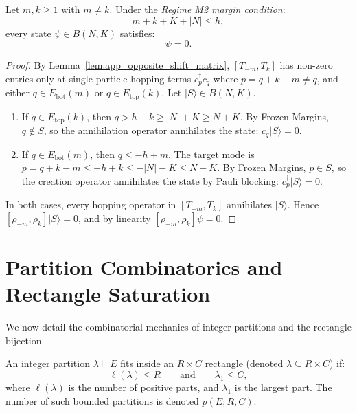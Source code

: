 \begin{theorem}
\label{thm:app_regime_m2}
Let $m, k \ge 1$ with $m \neq k$. Under the \emph{Regime M2 margin condition}:
\begin{equation}
m + k + K + |N| \le h,
\end{equation}
every state $\psi \in B(N, K)$ satisfies:
\begin{equation}
[\rho_{-m}, \rho_k] \psi = 0.
\end{equation}
\end{theorem}

\begin{proof}
By Lemma~\ref{lem:app_opposite_shift_matrix}, $[T_{-m}, T_k]$ has non-zero entries only at single-particle hopping terms $c_p^\dagger c_q$ where $p = q + k - m \neq q$, and either $q \in E_{\mathrm{bot}}(m)$ or $q \in E_{\mathrm{top}}(k)$.
Let $|S\rangle \in B(N, K)$.
\begin{enumerate}
    \item If $q \in E_{\mathrm{top}}(k)$, then $q > h - k \ge |N| + K \ge N + K$. By Frozen Margins, $q \notin S$, so the annihilation operator annihilates the state: $c_q |S\rangle = 0$.
    \item If $q \in E_{\mathrm{bot}}(m)$, then $q \le -h + m$. The target mode is $p = q + k - m \le -h + k \le -|N| - K \le N - K$. By Frozen Margins, $p \in S$, so the creation operator annihilates the state by Pauli blocking: $c_p^\dagger |S\rangle = 0$.
\end{enumerate}
In both cases, every hopping operator in $[T_{-m}, T_k]$ annihilates $|S\rangle$.
Hence $[\rho_{-m}, \rho_k] |S\rangle = 0$, and by linearity $[\rho_{-m}, \rho_k] \psi = 0$.
\end{proof}

\section{Partition Combinatorics and Rectangle Saturation}

We now detail the combinatorial mechanics of integer partitions and the rectangle bijection.

\begin{definition}
An integer partition $\lambda \vdash E$ fits inside an $R \times C$ rectangle (denoted $\lambda \subseteq R \times C$) if:
\begin{equation}
\ell(\lambda) \le R \qquad \text{and} \qquad \lambda_1 \le C,
\end{equation}
where $\ell(\lambda)$ is the number of positive parts, and $\lambda_1$ is the largest part.
The number of such bounded partitions is denoted $p(E; R, C)$.
\end{definition}


